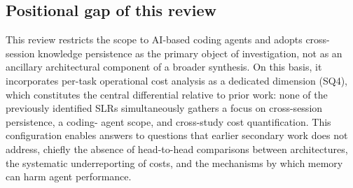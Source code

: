 \subsection{Positional gap of this review}
\label{sec:rel-lacuna}

This review restricts the scope to AI-based coding agents and adopts
cross-session knowledge persistence as the primary object of
investigation, not as an ancillary architectural component of a broader
synthesis.
On this basis, it incorporates per-task operational cost analysis as a
dedicated dimension (SQ4), which constitutes the central differential
relative to prior work: none of the previously identified SLRs
simultaneously gathers a focus on cross-session persistence, a coding-
agent scope, and cross-study cost quantification.
This configuration enables answers to questions that earlier secondary
work does not address, chiefly the absence of head-to-head comparisons
between architectures, the systematic underreporting of costs, and the
mechanisms by which memory can harm agent performance.

